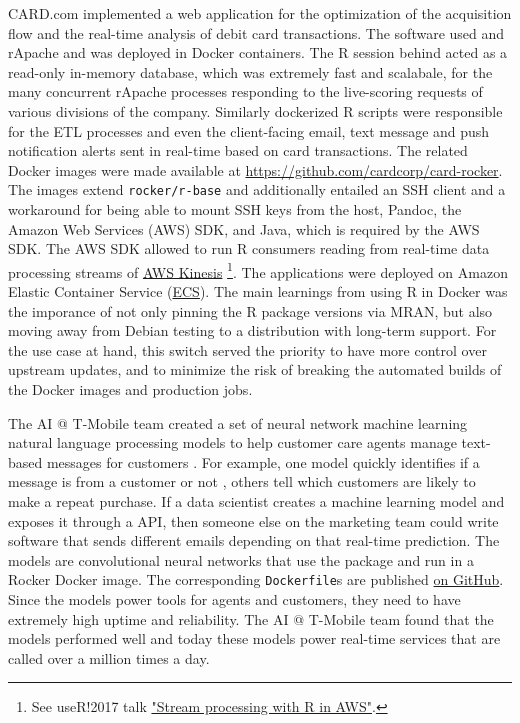 CARD.com implemented a web application for the optimization of the
acquisition flow and the real-time analysis of debit card transactions.
The software used  and rApache and was deployed in
Docker containers. The R session behind  acted as a
read-only in-memory database, which was extremely fast and scalabale,
for the many concurrent rApache processes responding to the live-scoring
requests of various divisions of the company. Similarly dockerized R
scripts were responsible for the ETL processes and even the
client-facing email, text message and push notification alerts sent in
real-time based on card transactions. The related Docker images were
made available at \url{https://github.com/cardcorp/card-rocker}. The
images extend \texttt{rocker/r-base} and additionally entailed an SSH
client and a workaround for being able to mount SSH keys from the host,
Pandoc, the Amazon Web Services (AWS) SDK, and Java, which is required
by the AWS SDK. The AWS SDK allowed to run R consumers reading from
real-time data processing streams of
\href{https://aws.amazon.com/kinesis/}{AWS Kinesis}
\footnote{See useR!2017 talk \href{https://static.sched.com/hosted\_files/user2017/2f/AWR Kinesis at useR 2017.pdf}{"Stream processing with R in AWS"}.}.
The applications were deployed on Amazon Elastic Container Service
(\href{https://aws.amazon.com/ecs/}{ECS}). The main learnings from using
R in Docker was the imporance of not only pinning the R package versions
via MRAN, but also moving away from Debian testing to a distribution
with long-term support. For the use case at hand, this switch served the
priority to have more control over upstream updates, and to minimize the
risk of breaking the automated builds of the Docker images and
production jobs.

The AI @ T-Mobile team created a set of neural network machine learning
natural language processing models to help customer care agents manage
text-based messages for customers \citep{t-mobile_enterprise_2018}. For
example, one model quickly identifies if a message is from a customer or
not
\citep[see -based \href{https://secure.message.t-mobile.com/v1/shiny/is-customer/app/}{demo}, ][]{nolis_small_2019},
others tell which customers are likely to make a repeat purchase. If a
data scientist creates a machine learning model and exposes it through a
 API, then someone else on the marketing team could
write software that sends different emails depending on that real-time
prediction. The models are convolutional neural networks that use the
 package and run in a Rocker Docker image. The
corresponding \texttt{Dockerfile}s are published
\href{https://github.com/tmobile/r-tensorflow-api}{on GitHub}. Since the
models power tools for agents and customers, they need to have extremely
high uptime and reliability. The AI @ T-Mobile team found that the
models performed well and today these models power real-time services
that are called over a million times a day.

